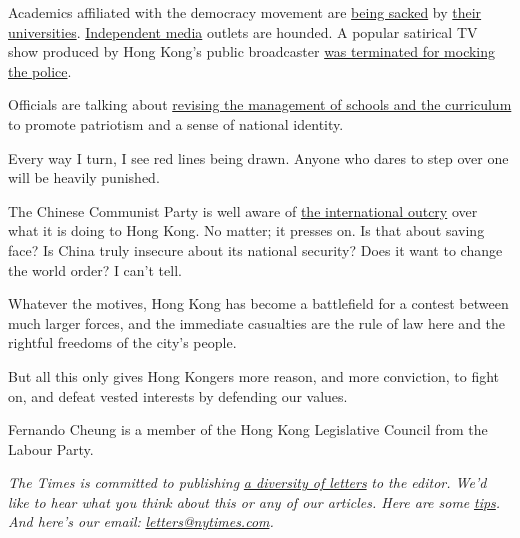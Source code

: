 Academics affiliated with the democracy movement are
\href{https://www.nytimes.com/2020/07/28/world/asia/benny-tai-hong-kong-university.html?campaign_id=7\&emc=edit_MBAE_p_20200728\&instance_id=20720\&nl=morning-briefing\&regi_id=65413713\&section=whatElse\&segment_id=34578\&te=1\&user_id=bd32fbf008e5183a7928ed61}{being
sacked} by
\href{https://www.scmp.com/news/hong-kong/politics/article/3046632/occupy-ringleader-shiu-ka-chun-accuses-hong-kong-university}{their
universities}.
\href{https://www.scmp.com/news/hong-kong/law-and-crime/article/3092957/hong-kong-media-tycoon-jimmy-lai-and-12-others-face}{Independent
media} outlets are hounded. A popular satirical TV show produced by Hong
Kong's public broadcaster
\href{https://hongkongfp.com/2020/05/19/hong-kong-public-broadcaster-axes-satirical-show-hours-after-govt-demands-apology-for-insulting-police/}{was
terminated for mocking the police}.

Officials are talking about
\href{https://www.scmp.com/news/hong-kong/education/article/3095434/hong-kong-national-security-law-schools-get-new-teaching}{revising
the management of schools and the curriculum} to promote patriotism and
a sense of national identity.

Every way I turn, I see red lines being drawn. Anyone who dares to step
over one will be heavily punished.

The Chinese Communist Party is well aware of
\href{https://www.state.gov/on-the-postponement-of-hong-kongs-legislative-council-elections/}{the
international outcry} over what it is doing to Hong Kong. No matter; it
presses on. Is that about saving face? Is China truly insecure about its
national security? Does it want to change the world order? I can't tell.

Whatever the motives, Hong Kong has become a battlefield for a contest
between much larger forces, and the immediate casualties are the rule of
law here and the rightful freedoms of the city's people.

But all this only gives Hong Kongers more reason, and more conviction,
to fight on, and defeat vested interests by defending our values.

Fernando Cheung is a member of the Hong Kong Legislative Council from
the Labour Party.

\emph{The Times is committed to publishing}
\href{https://www.nytimes.com/2019/01/31/opinion/letters/letters-to-editor-new-york-times-women.html}{\emph{a
diversity of letters}} \emph{to the editor. We'd like to hear what you
think about this or any of our articles. Here are some}
\href{https://help.nytimes.com/hc/en-us/articles/115014925288-How-to-submit-a-letter-to-the-editor}{\emph{tips}}\emph{.
And here's our email:}
\href{mailto:letters@nytimes.com}{\emph{letters@nytimes.com}}\emph{.}

